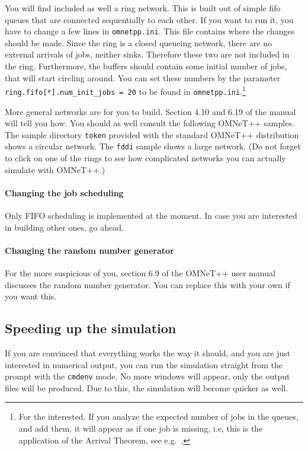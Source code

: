 \documentclass[a4paper]{article}
\begin{document}
You will find included as well a ring network. This is built out of
simple fifo queues that are connected sequentially to each other. If
you want to run it, you have to change a few lines in
\texttt{omnetpp.ini}. This file contains where the changes should be
made. Since the ring is a closed queueing network, there are no
external arrivals of jobs, neither sinks. Therefore these two are not
included in the ring. Furthermore, the buffers should contain some
initial number of jobs, that will start circling around. You can set
these numbers by the parameter \texttt{ring.fifo[*].num\_init\_jobs =
  20} to be found in \texttt{omnetpp.ini}.\footnote{For the
  interested. If you analyze the expected number of jobs in the
  queues, and add them, it will appear as if one job is missing, i.e,
 this is the application of the Arrival Theorem, see e.g.~\cite{Ross93}.}

More general networks are for you to build. Section 4.10 and 6.19 of
the manual will
tell you how. You should as well consult the following OMNeT++
samples. The sample directory \texttt{token} provided with the
standard OMNeT++ distribution shows a circular network. The
\texttt{fddi} sample shows a large network. (Do not forget to click on
one of the rings to see how complicated networks you can actually
simulate with OMNeT++.)


\paragraph{Changing the job scheduling}
\label{sec:chang-job-sched}
Only FIFO scheduling is implemented at the moment. In case you are
interested in building other ones, go ahead.

\paragraph{Changing the random number generator}
\label{sec:chang-rand-numb}
For the more suspicious of you, section 6.9 of the OMNeT++
user manual discusses the random number generator. You can replace
this with your own if you want this.


\subsection{Speeding up the simulation}
\label{sec:speed-up-simul}
If you are convinced that everything works the way it should, and you
are just interested in numerical output, you can run the simulation
straight from the prompt with the \texttt{cmdenv} mode. No more
windows will appear, only the output files will be produced. Due to
this, the simulation will become quicker as well.
\end{document}
